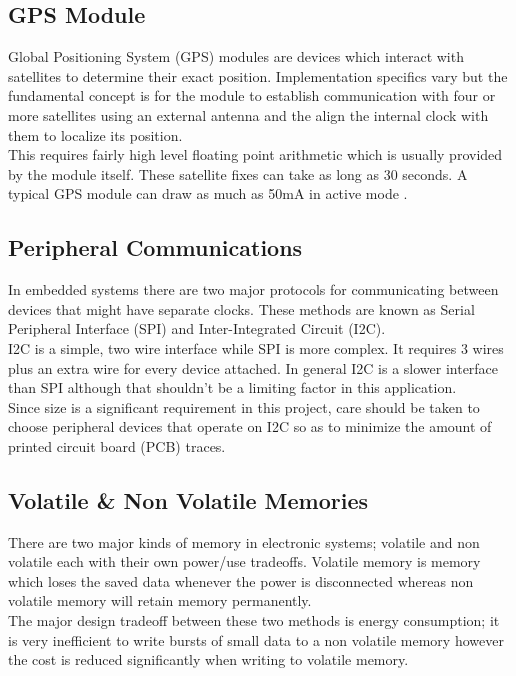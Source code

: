 \documentclass[12pt,openany,a4paper]{book}
\begin{document}
		\subsection{GPS Module}
			Global Positioning System (GPS) modules are devices which interact with satellites to determine their exact position. Implementation specifics vary but the fundamental concept is for the module to establish communication with four or more satellites using an external antenna and the align the internal clock with them to localize its position. \\
			
			This requires fairly high level floating point arithmetic which is usually provided by the module itself. These satellite fixes can take as long as 30 seconds. A typical GPS module can draw as much as 50mA in active mode \cite{Carroll10}.
			
		\subsection{Peripheral Communications}
			In embedded systems there are two major protocols for communicating between devices that might have separate clocks. These methods are known as Serial Peripheral Interface (SPI) and Inter-Integrated Circuit (I2C). \\
			
			I2C is a simple, two wire interface while SPI is more complex. It requires 3 wires plus an extra wire for every device attached. In general I2C is a slower interface than SPI although that shouldn't be a limiting factor in this application. \\
			
			Since size is a significant requirement in this project, care should be taken to choose peripheral devices that operate on I2C so as to minimize the amount of printed circuit board (PCB) traces. 
			
		\subsection{Volatile \& Non Volatile Memories}
			There are two major kinds of memory in electronic systems; volatile and non volatile each with their own power/use tradeoffs. Volatile memory is memory which loses the saved data whenever the power is disconnected whereas non volatile memory will retain memory permanently. \\
			
			The major design tradeoff between these two methods is energy consumption; it is very inefficient to write bursts of small data to a non volatile memory \cite{Sandisk} however the cost is reduced significantly when writing to volatile memory. \\
			
\end{document}
